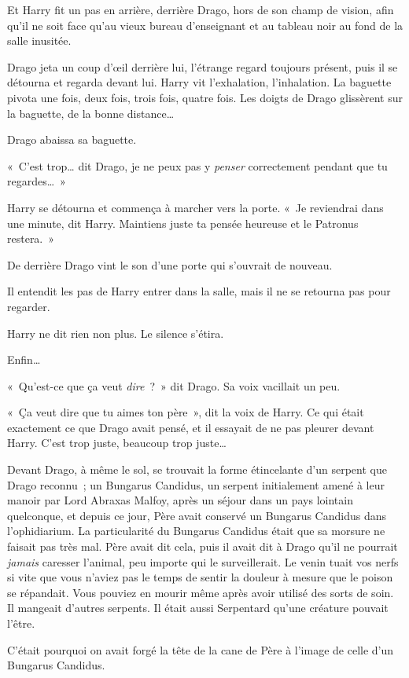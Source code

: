 Et Harry fit un pas en arrière, derrière Drago, hors de son champ de vision, afin qu'il ne soit face qu'au vieux bureau d'enseignant et au tableau noir au fond de la salle inusitée.

Drago jeta un coup d'œil derrière lui, l'étrange regard toujours présent, puis il se détourna et regarda devant lui. Harry vit l'exhalation, l'inhalation. La baguette pivota une fois, deux fois, trois fois, quatre fois. Les doigts de Drago glissèrent sur la baguette, de la bonne distance…

Drago abaissa sa baguette.

«~C'est trop… dit Drago, je ne peux pas y \emph{penser} correctement pendant que tu regardes…~»

Harry se détourna et commença à marcher vers la porte. «~Je reviendrai dans une minute, dit Harry. Maintiens juste ta pensée heureuse et le Patronus restera.~»

\later

De derrière Drago vint le son d'une porte qui s'ouvrait de nouveau.

Il entendit les pas de Harry entrer dans la salle, mais il ne se retourna pas pour regarder.

Harry ne dit rien non plus. Le silence s'étira.

Enfin…

«~Qu'est-ce que ça veut \emph{dire}~?~» dit Drago. Sa voix vacillait un peu.

«~Ça veut dire que tu aimes ton père~», dit la voix de Harry. Ce qui était exactement ce que Drago avait pensé, et il essayait de ne pas pleurer devant Harry. C'est trop juste, beaucoup trop juste…

Devant Drago, à même le sol, se trouvait la forme étincelante d'un serpent que Drago reconnu~; un Bungarus Candidus, un serpent initialement amené à leur manoir par Lord Abraxas Malfoy, après un séjour dans un pays lointain quelconque, et depuis ce jour, Père avait conservé un Bungarus Candidus dans l'ophidiarium. La particularité du Bungarus Candidus était que sa morsure ne faisait pas très mal. Père avait dit cela, puis il avait dit à Drago qu'il ne pourrait \emph{jamais} caresser l'animal, peu importe qui le surveillerait. Le venin tuait vos nerfs si vite que vous n'aviez pas le temps de sentir la douleur à mesure que le poison se répandait. Vous pouviez en mourir même après avoir utilisé des sorts de soin. Il mangeait d'autres serpents. Il était aussi Serpentard qu'une créature pouvait l'être.

C'était pourquoi on avait forgé la tête de la cane de Père à l'image de celle d'un Bungarus Candidus.

